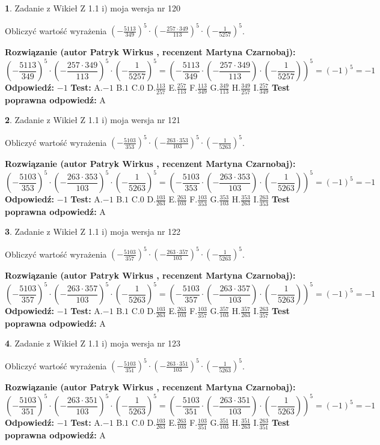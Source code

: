 \documentclass[12pt, a4paper]{article}
\theoremstyle{definition} %
\newtheorem{zad}{}
\newcommand{\zadStart}[1]{\begin{zad}#1\newline}
\newcommand{\zadStop}{\end{zad}}
\newcommand{\rozwStart}[2]{\noindent \textbf{Rozwiązanie (autor #1 , recenzent #2): }\newline}
\newcommand{\rozwStop}{\newline}
\newcommand{\odpStart}{\noindent \textbf{Odpowiedź:}\newline}
\newcommand{\odpStop}{\newline}
\newcommand{\testStart}{\noindent \textbf{Test:}\newline}
\newcommand{\testStop}{\newline}
\newcommand{\kluczStart}{\noindent \textbf{Test poprawna odpowiedź:}\newline}
\newcommand{\kluczStop}{\newline}
\begin{document}
\zadStart{Zadanie z Wikieł Z 1.1 i) moja wersja nr 120}

Obliczyć wartość wyrażenia $(-\frac{5113}{349})^{5} \cdot (-\frac{257 \cdot 349}{113})^{5} \cdot (-\frac{1}{5257})^{5}$.
\zadStop
\rozwStart{Patryk Wirkus}{Martyna Czarnobaj}
$$(-\frac{5113}{349})^{5} \cdot (-\frac{257 \cdot 349}{113})^{5} \cdot (-\frac{1}{5257})^{5} = (-\frac{5113}{349} \cdot (-\frac{257 \cdot 349}{113}) \cdot (-\frac{1}{5257}))^{5} = (-1)^{5} = -1$$
\rozwStop
\odpStart
$-1$
\odpStop
\testStart
A.$-1$ B.$1$ C.$0$ D.$\frac{113}{257}$ E.$\frac{257}{113}$
F.$\frac{113}{349}$ G.$\frac{349}{113}$
H.$\frac{349}{257}$
I.$\frac{257}{349}$
\testStop
\kluczStart
A
\kluczStop



\zadStart{Zadanie z Wikieł Z 1.1 i) moja wersja nr 121}

Obliczyć wartość wyrażenia $(-\frac{5103}{353})^{5} \cdot (-\frac{263 \cdot 353}{103})^{5} \cdot (-\frac{1}{5263})^{5}$.
\zadStop
\rozwStart{Patryk Wirkus}{Martyna Czarnobaj}
$$(-\frac{5103}{353})^{5} \cdot (-\frac{263 \cdot 353}{103})^{5} \cdot (-\frac{1}{5263})^{5} = (-\frac{5103}{353} \cdot (-\frac{263 \cdot 353}{103}) \cdot (-\frac{1}{5263}))^{5} = (-1)^{5} = -1$$
\rozwStop
\odpStart
$-1$
\odpStop
\testStart
A.$-1$ B.$1$ C.$0$ D.$\frac{103}{263}$ E.$\frac{263}{103}$
F.$\frac{103}{353}$ G.$\frac{353}{103}$
H.$\frac{353}{263}$
I.$\frac{263}{353}$
\testStop
\kluczStart
A
\kluczStop



\zadStart{Zadanie z Wikieł Z 1.1 i) moja wersja nr 122}

Obliczyć wartość wyrażenia $(-\frac{5103}{357})^{5} \cdot (-\frac{263 \cdot 357}{103})^{5} \cdot (-\frac{1}{5263})^{5}$.
\zadStop
\rozwStart{Patryk Wirkus}{Martyna Czarnobaj}
$$(-\frac{5103}{357})^{5} \cdot (-\frac{263 \cdot 357}{103})^{5} \cdot (-\frac{1}{5263})^{5} = (-\frac{5103}{357} \cdot (-\frac{263 \cdot 357}{103}) \cdot (-\frac{1}{5263}))^{5} = (-1)^{5} = -1$$
\rozwStop
\odpStart
$-1$
\odpStop
\testStart
A.$-1$ B.$1$ C.$0$ D.$\frac{103}{263}$ E.$\frac{263}{103}$
F.$\frac{103}{357}$ G.$\frac{357}{103}$
H.$\frac{357}{263}$
I.$\frac{263}{357}$
\testStop
\kluczStart
A
\kluczStop



\zadStart{Zadanie z Wikieł Z 1.1 i) moja wersja nr 123}

Obliczyć wartość wyrażenia $(-\frac{5103}{351})^{5} \cdot (-\frac{263 \cdot 351}{103})^{5} \cdot (-\frac{1}{5263})^{5}$.
\zadStop
\rozwStart{Patryk Wirkus}{Martyna Czarnobaj}
$$(-\frac{5103}{351})^{5} \cdot (-\frac{263 \cdot 351}{103})^{5} \cdot (-\frac{1}{5263})^{5} = (-\frac{5103}{351} \cdot (-\frac{263 \cdot 351}{103}) \cdot (-\frac{1}{5263}))^{5} = (-1)^{5} = -1$$
\rozwStop
\odpStart
$-1$
\odpStop
\testStart
A.$-1$ B.$1$ C.$0$ D.$\frac{103}{263}$ E.$\frac{263}{103}$
F.$\frac{103}{351}$ G.$\frac{351}{103}$
H.$\frac{351}{263}$
I.$\frac{263}{351}$
\testStop
\kluczStart
A
\kluczStop
\end{document}
